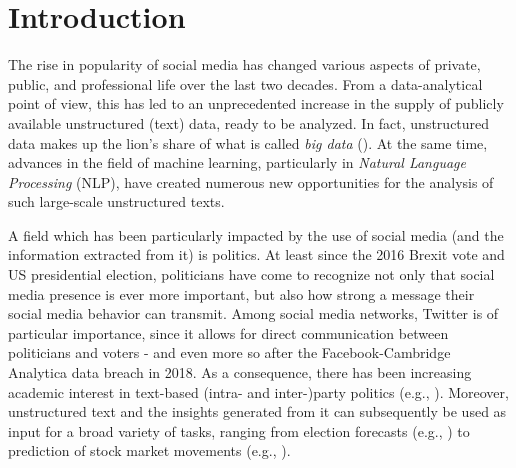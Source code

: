 \section{Introduction}

The rise in popularity of social media has changed various aspects of private, public, and professional life over the last two decades. From a data-analytical point of view, this has led to an unprecedented increase in the supply of publicly available unstructured (text) data, ready to be analyzed. In fact, unstructured data makes up the lion's share of what is called \textit{big data} (\citealp{gandomi2015beyond}). At the same time, advances in the field of machine learning, particularly in \textit{Natural Language Processing} (NLP), have created numerous new opportunities for the analysis of such large-scale unstructured texts.

A field which has been particularly impacted by the use of social media (and the information extracted from it) is politics. At least since the 2016 Brexit vote and US presidential election, politicians have come to recognize not only that social media presence is ever more important, but also how strong a message their social media behavior can transmit. Among social media networks, Twitter is of particular importance, since it allows for direct communication between politicians and voters - and even more so after the Facebook-Cambridge Analytica data breach in 2018. As a consequence, there has been increasing academic interest in text-based (intra- and inter-)party politics (e.g., \citealp{ceron2017intra, daniel2019static, grimmer2010bayesian, quinlan2018show}). Moreover, unstructured text and the insights generated from it can subsequently be used as input for a broad variety of tasks, ranging from election forecasts (e.g., \citealp{burnap2016140, jungherr2016twitter, tumasjan2010predicting}) to prediction of stock market movements (e.g., \citealp{nisar2018twitter}).

